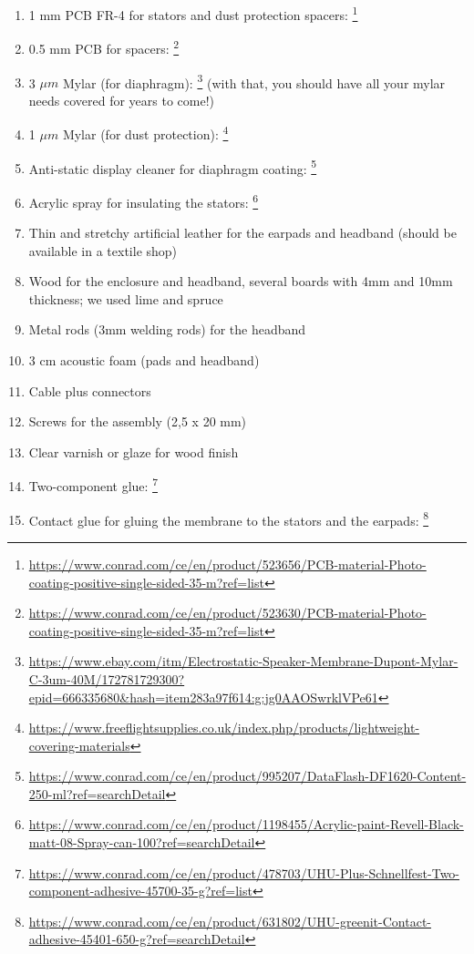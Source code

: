 \documentclass{article}
\begin{document}
\begin{enumerate}
    \item 1 mm PCB FR-4 for stators and dust protection spacers:  \footnote{\url{https://www.conrad.com/ce/en/product/523656/PCB-material-Photo-coating-positive-single-sided-35-m?ref=list}}
    \item 0.5 mm PCB for spacers: \footnote{\url{https://www.conrad.com/ce/en/product/523630/PCB-material-Photo-coating-positive-single-sided-35-m?ref=list}}
    \item 3 $\mu m$ Mylar (for diaphragm): \footnote{\url{https://www.ebay.com/itm/Electrostatic-Speaker-Membrane-Dupont-Mylar-C-3um-40M/172781729300?epid=666335680&hash=item283a97f614:g:jg0AAOSwrklVPe61}} (with that, you should have all your mylar needs covered for years to come!)
    \item 1 $\mu m$ Mylar (for dust protection): \footnote{\url{https://www.freeflightsupplies.co.uk/index.php/products/lightweight-covering-materials}}
    \item Anti-static display cleaner for diaphragm coating: \footnote{\url{https://www.conrad.com/ce/en/product/995207/DataFlash-DF1620-Content-250-ml?ref=searchDetail}}
    \item Acrylic spray for insulating the stators: \footnote{\url{https://www.conrad.com/ce/en/product/1198455/Acrylic-paint-Revell-Black-matt-08-Spray-can-100?ref=searchDetail}}
    \item Thin and stretchy artificial leather for the earpads and headband (should be available in a textile shop)
    \item Wood for the enclosure and headband, several boards with 4mm and 10mm thickness; we used lime and spruce
    \item Metal rods (3mm welding rods) for the headband
    \item 3 cm acoustic foam (pads and headband)
    \item Cable plus connectors
    \item Screws for the assembly (2,5 x 20 mm)
    \item Clear varnish or glaze for wood finish
    \item Two-component glue: \footnote{\url{https://www.conrad.com/ce/en/product/478703/UHU-Plus-Schnellfest-Two-component-adhesive-45700-35-g?ref=list}}
    \item Contact glue for gluing the membrane to the stators and the earpads: \footnote{\url{https://www.conrad.com/ce/en/product/631802/UHU-greenit-Contact-adhesive-45401-650-g?ref=searchDetail}}

\end{enumerate}
\end{document}
